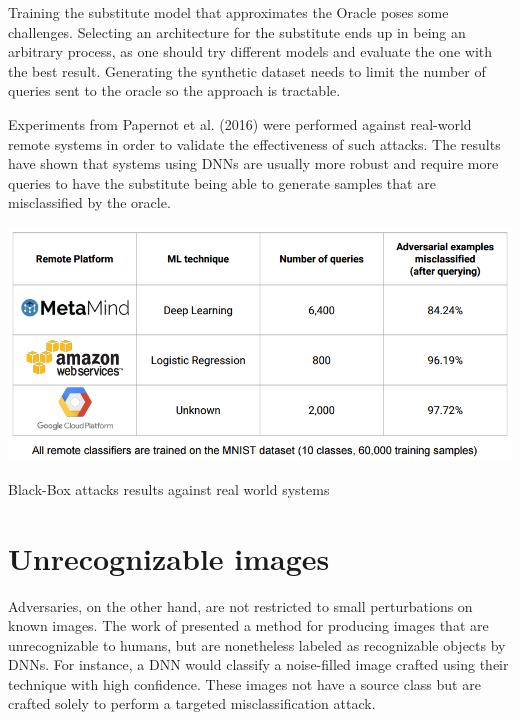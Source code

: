 Training the substitute model that approximates the Oracle poses some challenges. Selecting an architecture for the substitute ends up in being an arbitrary process, as one should try different models and evaluate the one with the best result. Generating the synthetic dataset needs to limit the number of queries sent to the oracle so the approach is tractable. 

Experiments from Papernot et al. (2016) were performed against real-world remote systems in order to validate the effectiveness of such attacks. The results have shown that systems using DNNs are usually more robust and require more queries to have the substitute being able to generate samples that are misclassified by the oracle.

\begin{table}[!h]
	\centering
	\includegraphics[scale=0.7]{black_box.png}
	\caption{Black-Box attacks results against real world systems}
	\label{tbl:black_box}
\end{table}

\section{Unrecognizable images}\label{subsec:unrec}

Adversaries, on the other hand, are not restricted to small perturbations on known images. The work of \cite{nguyen2015} presented a method for producing images that are unrecognizable to humans, but are nonetheless labeled as recognizable objects by DNNs. For instance, a DNN would classify a noise-filled image crafted using their technique with high confidence. These images not have a source class but are crafted solely to perform a targeted misclassification attack.

